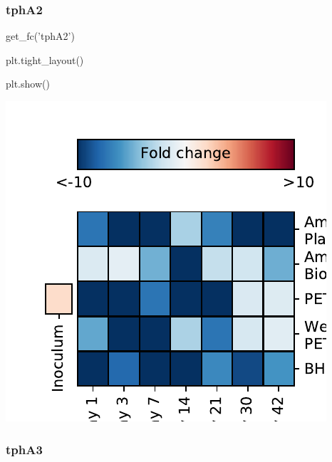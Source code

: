 \documentclass[
]{article}
\newenvironment{Shaded}{\begin{snugshade}}{\end{snugshade}}
\newcommand{\NormalTok}[1]{#1}
\newcommand{\StringTok}[1]{\textcolor[rgb]{0.31,0.60,0.02}{#1}}
\begin{document}
\hypertarget{tpha2-1}{%
\subsubsection{tphA2}\label{tpha2-1}}

\begin{Shaded}
\begin{Highlighting}[]
\NormalTok{get_fc(}\StringTok{'tphA2'}\NormalTok{)}
\end{Highlighting}
\end{Shaded}

\begin{Shaded}
\begin{Highlighting}[]
\NormalTok{plt.tight_layout()}
\end{Highlighting}
\end{Shaded}

\begin{Shaded}
\begin{Highlighting}[]
\NormalTok{plt.show()}
\end{Highlighting}
\end{Shaded}

\includegraphics{20-6-15-PET-plastisphere-PICRUSt2_files/figure-latex/plot_fc_tphA2-1.pdf}

\hypertarget{tpha3-1}{%
\subsubsection{tphA3}\label{tpha3-1}}
\end{document}
